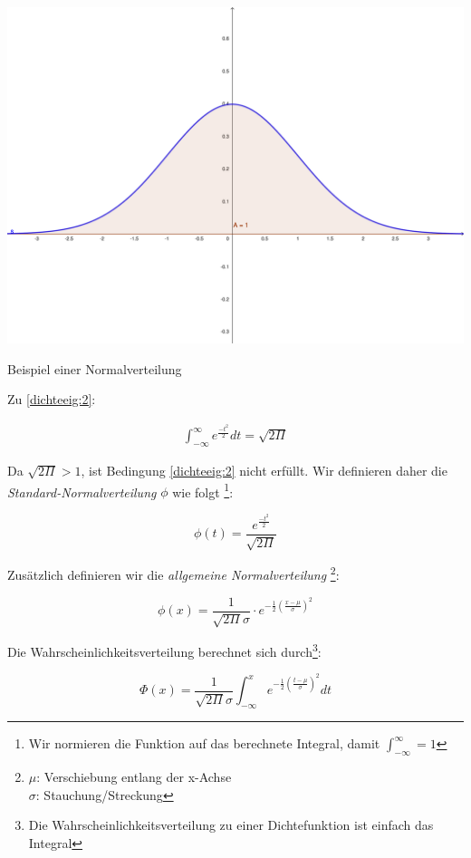 \documentclass{tufte-handout}
\theoremstyle{own}
\begin{document}
\begin{marginfigure}
	\includegraphics{normalverteilung}
	\caption{Beispiel einer Normalverteilung}
\end{marginfigure}

Zu \eqref{dichteeig:2}:

\begin{gather*}
	\int_{-\infty}^\infty e^{\frac{- t^2}{2}} dt = \sqrt{2 \Pi}
\end{gather*}

Da $\sqrt{2\Pi} > 1$, ist Bedingung \eqref{dichteeig:2} nicht erfüllt. Wir definieren daher die \textit{Standard-Normalverteilung} $\phi$ wie folgt
\footnote{Wir normieren die Funktion auf das berechnete Integral, damit $\int_{-\infty}^\infty = 1$}:

\begin{equation}
\phi(t) = \frac{e^{\frac{-t^2}{2}}}{\sqrt{2 \Pi}}
\end{equation}

Zusätzlich definieren wir die \textit{allgemeine Normalverteilung}
\footnote{
$\mu$: Verschiebung entlang der x-Achse \\
$\sigma$: Stauchung/Streckung}:

\begin{equation}
\phi(x) = \frac{1}{\sqrt{2 \Pi} \sigma} \cdot e^{- \frac{1}{2} (\frac{x - \mu}{\sigma})^2}
\end{equation}

Die Wahrscheinlichkeitsverteilung berechnet sich durch\footnote{Die Wahrscheinlichkeitsverteilung zu einer Dichtefunktion ist einfach das Integral}:

\begin{equation}
\Phi(x) = \frac{1}{\sqrt{2 \Pi} \sigma} \int_{-\infty}^x e^{- \frac{1}{2} (\frac{t - \mu}{\sigma})^2} dt
\end{equation}
\end{document}
